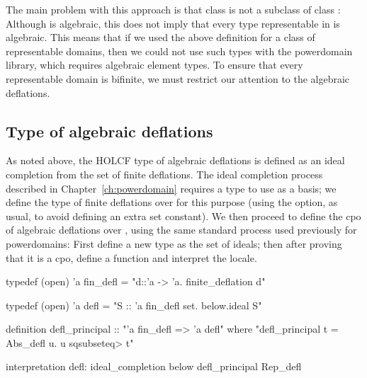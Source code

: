 The main problem with this approach is that class  is not a subclass of class : Although  is algebraic, this does not imply that every type representable in  is algebraic. This means that if we used the above definition for a class of representable domains, then we could not use such types with the powerdomain library, which requires algebraic element types. To ensure that every representable domain is bifinite, we must restrict our attention to the algebraic deflations.


\subsection{Type of algebraic deflations}
\label{sec:definitional-alg-type}

As noted above, the HOLCF type of algebraic deflations is defined as an ideal completion from the set of finite deflations. The ideal completion process described in Chapter~\ref{ch:powerdomain} requires a type to use as a basis; we define the type  of finite deflations over  for this purpose (using the  option, as usual, to avoid defining an extra set constant). We then proceed to define the cpo  of algebraic deflations over , using the same standard process used previously for powerdomains: First define a new type as the set of ideals; then after proving that it is a cpo, define a  function and interpret the  locale.
%
\begin{isacode}
typedef (open) 'a fin_defl = "{d::'a -> 'a. finite_deflation d}"
\end{isacode}
\unmedskip
{}
\begin{isacode}
typedef (open) 'a defl = "{S :: 'a fin_defl set. below.ideal S}"
\end{isacode}
\unmedskip
{}
\begin{isacode}
definition defl_principal :: "'a fin_defl => 'a defl"
  where "defl_principal t = Abs_defl {u. u \<sqsubseteq> t}"
\end{isacode}
\unmedskip
\begin{isacode}
interpretation defl: ideal_completion below defl_principal Rep_defl
\end{isacode}

